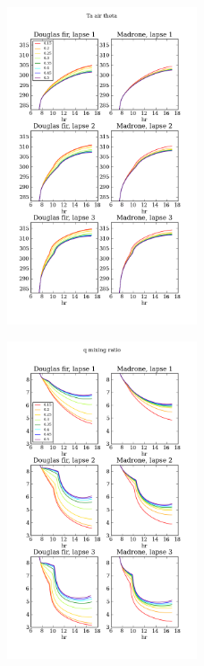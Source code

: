 \begin{figure}[here]
\includegraphics[width=0.5\textwidth]{ch2-BL/figures/testall_compare_sm_lapse_Ta.png}
\caption{}
\label{fig:BL_1DdiurnalTa}
\end{figure}

\begin{figure}[here]
\includegraphics[width=0.5\textwidth]{ch2-BL/figures/testall_compare_sm_lapse_q.png}
\caption{}
\label{fig:BL_1DdiurnalQ}
\end{figure}

